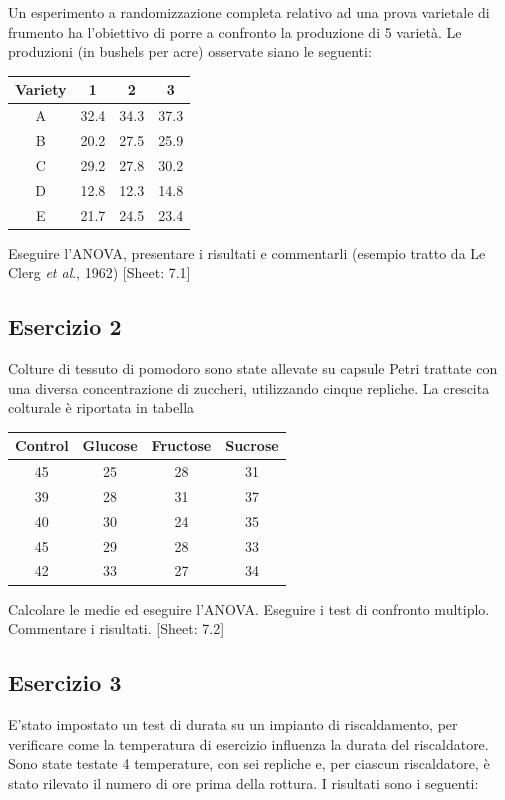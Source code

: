 \documentclass[a4paper,12pt,oneside]{book}
\begin{document}
Un esperimento a randomizzazione completa relativo ad una prova varietale di frumento ha l'obiettivo di porre a confronto la produzione di 5 varietà. Le produzioni (in bushels per acre) osservate siano le seguenti:

\begin{longtable}[]{@{}cccc@{}}
\toprule()
Variety & 1 & 2 & 3 \\
\midrule()
\endhead
A & 32.4 & 34.3 & 37.3 \\
B & 20.2 & 27.5 & 25.9 \\
C & 29.2 & 27.8 & 30.2 \\
D & 12.8 & 12.3 & 14.8 \\
E & 21.7 & 24.5 & 23.4 \\
\bottomrule()
\end{longtable}

Eseguire l'ANOVA, presentare i risultati e commentarli (esempio tratto da Le Clerg \emph{et al}., 1962)
{[}Sheet: 7.1{]}

\hypertarget{esercizio-2-5}{%
\subsection{Esercizio 2}\label{esercizio-2-5}}

Colture di tessuto di pomodoro sono state allevate su capsule Petri trattate con una diversa concentrazione di zuccheri, utilizzando cinque repliche. La crescita colturale è riportata in tabella

\begin{longtable}[]{@{}cccc@{}}
\toprule()
Control & Glucose & Fructose & Sucrose \\
\midrule()
\endhead
45 & 25 & 28 & 31 \\
39 & 28 & 31 & 37 \\
40 & 30 & 24 & 35 \\
45 & 29 & 28 & 33 \\
42 & 33 & 27 & 34 \\
\bottomrule()
\end{longtable}

Calcolare le medie ed eseguire l'ANOVA. Eseguire i test di confronto multiplo. Commentare i risultati.
{[}Sheet: 7.2{]}

\hypertarget{esercizio-3-5}{%
\subsection{Esercizio 3}\label{esercizio-3-5}}

E'stato impostato un test di durata su un impianto di riscaldamento, per verificare come la temperatura di esercizio influenza la durata del riscaldatore. Sono state testate 4 temperature, con sei repliche e, per ciascun riscaldatore, è stato rilevato il numero di ore prima della rottura. I risultati sono i seguenti:
\end{document}
